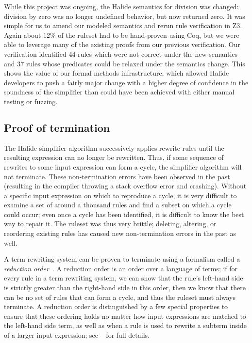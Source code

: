 While this project was ongoing, the Halide semantics for division was changed: division by zero was no longer undefined behavior, but now returned zero. It was simple for us to amend our modeled semantics and rerun rule verification in Z3. Again about 12\% of the ruleset had to be hand-proven using Coq, but we were able to leverage many of the existing proofs from our previous verification. Our verification identified 44 rules which were not correct under the new semantics and 37 rules whose predicates could be relaxed under the semantics change. This shows the value of our formal methods infrastructure, which allowed Halide developers to push a fairly major change with a higher degree of confidence in the soundness of the simplifier than could have been achieved with either manual testing or fuzzing.

\subsection{Proof of termination}
The Halide simplifier algorithm successively applies rewrite rules until the resulting expression can no longer be rewritten. Thus, if some sequence of rewrites to some input expression can form a cycle, the simplifier algorithm will not terminate. These non-termination errors have been observed in the past (resulting in the compiler throwing a stack overflow error and crashing). Without a specific input expression on which to reproduce a cycle, it is very difficult to examine a set of around a thousand rules and find a subset on which a cycle could occur; even once a cycle has been identified, it is difficult to know the best way to repair it. The ruleset was thus very brittle; deleting, altering, or reordering existing rules has caused new non-termination errors in the past as well.

A term rewriting system can be proven to terminate using a formalism called a \emph{reduction order}~\cite{baader1999term}. A reduction order is an order over a language of terms; if for every rule in a term rewriting system, we can show that the rule's left-hand side is strictly greater than the right-hand side in this order, then we know that there can be no set of rules that can form a cycle, and thus the ruleset must always terminate. A reduction order is distinguished by a few special properties to ensure that these ordering holds no matter how input expressions are matched to the left-hand side term, as well as when a rule is used to rewrite a subterm inside of a larger input expression; see ~\cite{newcomb2020verifying} for full details.

